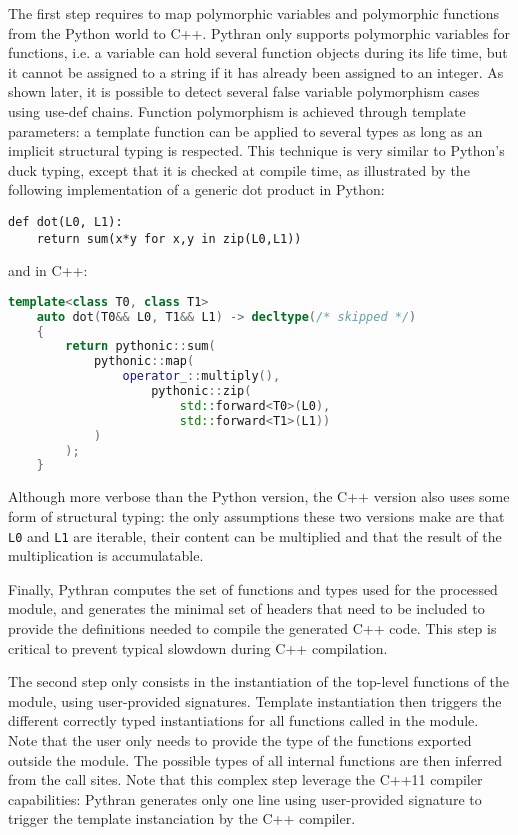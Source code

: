 \documentclass[10pt, onecolumn, preprint]{sigplanconf}
\begin{document}
The first step requires to map polymorphic variables and polymorphic functions
from the Python world to C++. Pythran only supports polymorphic variables for
functions, i.e. a variable can hold several function objects during its life
time, but it cannot be assigned to a string if it has already been assigned to
an integer.  As shown later, it is possible to detect several false variable
polymorphism cases using use-def chains. Function polymorphism is achieved
through template parameters: a template function can be applied to several
types as long as an implicit structural typing is respected. This technique is
very similar to Python's duck typing, except that it is checked at compile
time, as illustrated by the following implementation of a generic dot product
in Python:

\begin{lstlisting}
def dot(L0, L1):
    return sum(x*y for x,y in zip(L0,L1))
\end{lstlisting}

\noindent and in C++:

\begin{lstlisting}[language=c++]
template<class T0, class T1>
    auto dot(T0&& L0, T1&& L1) -> decltype(/* skipped */)
    {
        return pythonic::sum(
            pythonic::map(
                operator_::multiply(),
                    pythonic::zip(
                        std::forward<T0>(L0),
                        std::forward<T1>(L1))
            )
        );
    }
\end{lstlisting}

Although more verbose than the Python version, the C++ version also uses some
form of structural typing: the only assumptions these two versions make are
that \texttt{L0} and \texttt{L1} are iterable, their content can be multiplied
and that the result of the multiplication is accumulatable.

Finally, Pythran computes the set of functions and types used for the processed
module, and generates the minimal set of headers that need to be included to
provide the definitions needed to compile the generated C++ code. This step is
critical to prevent typical slowdown during C++ compilation.

The second step only consists in the instantiation of the top-level functions of
the module, using user-provided signatures. Template instantiation then triggers
the different correctly typed instantiations for all functions called in the
module. Note that the user only needs to provide the type of the functions
exported outside the module. The possible types of all internal functions are
then inferred from the call sites. Note that this complex step leverage the 
C++11 compiler capabilities: Pythran generates only one line using user-provided
signature to trigger the template instanciation by the C++ compiler.
\end{document}
